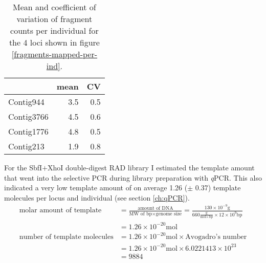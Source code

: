 \documentclass[a4paper,12pt,times,authoryear,twoside,print,index]{Classes/PhDThesisPSnPDF}\usepackage[]{graphicx}\usepackage[]{color}
\begin{document}
\begin{table}[ht]
\centering
\caption{Mean and coefficient of variation of fragment counts per individual for the 4 loci shown in figure \ref{fragments-mapped-per-ind}.} 
\label{mean_sd_fragNum_per_locus}
\begin{tabular}{lrr}
  \toprule
 & mean & CV \\ 
  \midrule
Contig944 & 3.5 & 0.5 \\ 
  Contig3766 & 4.5 & 0.6 \\ 
  Contig1776 & 4.8 & 0.5 \\ 
  Contig213 & 1.9 & 0.8 \\ 
   \bottomrule
\end{tabular}
\end{table}

%
For the SbfI$+$XhoI double-digest RAD library I estimated the template amount that went into the selective PCR during library preparation with \textit{q}PCR. This also indicated a very low template amount of on average 1.26 ($\pm$ 0.37) template molecules per locus and individual (see section \ref{ch:qPCR}).
%
\footnotesize
\begin{align}
\text{molar amount of template} &= \frac{\text{amount of DNA}}{\text{MW of bp} \times \text{genome size}} 
= \frac{130 \times 10^{-9}\text{g}}{660 \frac{\text{g}}{\text{mol} \times \text{bp}} \times 12 \times 10^{9} \text{bp}} \label{eq:genome_copies} \\
&= 1.26 \times 10^{-20} \text{mol} \nonumber \\[5pt]
\text{number of template molecules} &= 1.26 \times 10^{-20} \text{mol} \times \text{Avogadro's number} \nonumber \\
&= 1.26 \times 10^{-20} \text{mol} \times 6.0221413 \times 10^{23} \nonumber \\
&= 9884 \nonumber
\end{align}
\normalsize
\end{document}

